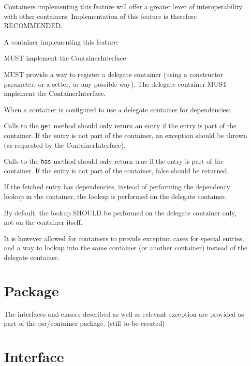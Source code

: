 Containers implementing this feature will offer a greater lever of interoperability with other containers. Implementation of this feature is therefore RECOMMENDED.

A container implementing this feature:

\begin{compactitem}
\item MUST implement the ContainerInterface
\item MUST provide a way to register a delegate container (using a constructor parameter, or a setter, or any possible way). The delegate container MUST implement the ContainerInterface.
\end{compactitem}

When a container is configured to use a delegate container for dependencies:

\begin{compactitem}
\item Calls to the \texttt{get} method should only return an entry if the entry is part of the container. If the entry is not part of the container, an exception should be thrown (as requested by the ContainerInterface).
\item Calls to the \texttt{has} method should only return true if the entry is part of the container. If the entry is not part of the container, false should be returned.
\item If the fetched entry has dependencies, instead of performing the dependency lookup in the container, the lookup is performed on the delegate container.

\end{compactitem}

By default, the lookup SHOULD be performed on the delegate container only, not on the container itself.

It is however allowed for containers to provide exception cases for special entries, and a way to lookup into the same container (or another container) instead of the delegate container.


\section{Package}


The interfaces and classes described as well as relevant exception are provided as part of the psr/container package. (still to-be-created)


\section{Interface}



